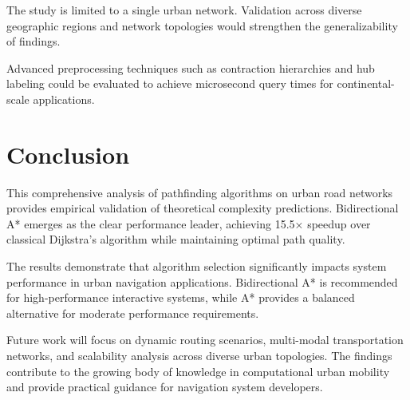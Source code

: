 \documentclass[conference]{IEEEtran}
\begin{document}
The study is limited to a single urban network. Validation across diverse geographic regions and network topologies would strengthen the generalizability of findings.

Advanced preprocessing techniques such as contraction hierarchies and hub labeling could be evaluated to achieve microsecond query times for continental-scale applications.

\section{Conclusion}

This comprehensive analysis of pathfinding algorithms on urban road networks provides empirical validation of theoretical complexity predictions. Bidirectional A* emerges as the clear performance leader, achieving 15.5× speedup over classical Dijkstra's algorithm while maintaining optimal path quality.

The results demonstrate that algorithm selection significantly impacts system performance in urban navigation applications. Bidirectional A* is recommended for high-performance interactive systems, while A* provides a balanced alternative for moderate performance requirements.

Future work will focus on dynamic routing scenarios, multi-modal transportation networks, and scalability analysis across diverse urban topologies. The findings contribute to the growing body of knowledge in computational urban mobility and provide practical guidance for navigation system developers.
\end{document}
